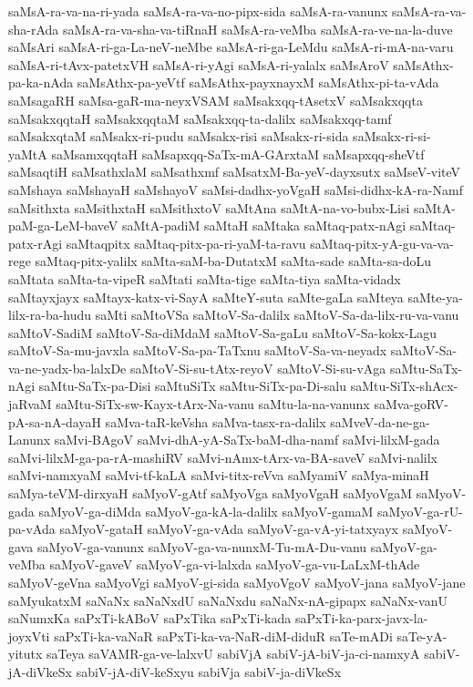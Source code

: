 {saMsA-ra-va-na-ri-yada
saMsA-ra-va-no-pipx-sida
saMsA-ra-vanunx
saMsA-ra-va-sha-rAda
saMsA-ra-va-sha-va-tiRnaH
saMsA-ra-veMba
saMsA-ra-ve-na-la-duve
saMsAri
saMsA-ri-ga-La-neV-neMbe
saMsA-ri-ga-LeMdu
saMsA-ri-mA-na-varu
saMsA-ri-tAvx-patetxVH
saMsA-ri-yAgi
saMsA-ri-yalalx
saMsAroV
saMsAthx-pa-ka-nAda
saMsAthx-pa-yeVtf
saMsAthx-payxnayxM
saMsAthx-pi-ta-vAda
saMsagaRH
saMsa-gaR-ma-neyxVSAM
saMsakxqq-tAsetxV
saMsakxqqta
saMsakxqqtaH
saMsakxqqtaM
saMsakxqq-ta-dalilx
saMsakxqq-tamf
saMsakxqtaM
saMsakx-ri-pudu
saMsakx-risi
saMsakx-ri-sida
saMsakx-ri-si-yaMtA
saMsamxqqtaH
saMsapxqq-SaTx-mA-GArxtaM
saMsapxqq-sheVtf
saMsaqtiH
saMsathxlaM
saMsathxmf
saMsatxM-Ba-yeV-dayxsutx
saMseV-viteV
saMshaya
saMshayaH
saMshayoV
saMsi-dadhx-yoVgaH
saMsi-didhx-kA-ra-Namf
saMsithxta
saMsithxtaH
saMsithxtoV
saMtAna
saMtA-na-vo-bubx-Lisi
saMtA-paM-ga-LeM-baveV
saMtA-padiM
saMtaH
saMtaka
saMtaq-patx-nAgi
saMtaq-patx-rAgi
saMtaqpitx
saMtaq-pitx-pa-ri-yaM-ta-ravu
saMtaq-pitx-yA-gu-va-va-rege
saMtaq-pitx-yalilx
saMta-saM-ba-DutatxM
saMta-sade
saMta-sa-doLu
saMtata
saMta-ta-vipeR
saMtati
saMta-tige
saMta-tiya
saMta-vidadx
saMtayxjayx
saMtayx-katx-vi-SayA
saMteY-suta
saMte-gaLa
saMteya
saMte-ya-lilx-ra-ba-hudu
saMti
saMtoVSa
saMtoV-Sa-dalilx
saMtoV-Sa-da-lilx-ru-va-vanu
saMtoV-SadiM
saMtoV-Sa-diMdaM
saMtoV-Sa-gaLu
saMtoV-Sa-kokx-Lagu
saMtoV-Sa-mu-javxla
saMtoV-Sa-pa-TaTxnu
saMtoV-Sa-va-neyadx
saMtoV-Sa-va-ne-yadx-ba-lalxDe
saMtoV-Si-su-tAtx-reyoV
saMtoV-Si-su-vAga
saMtu-SaTx-nAgi
saMtu-SaTx-pa-Disi
saMtuSiTx
saMtu-SiTx-pa-Di-salu
saMtu-SiTx-shAcx-jaRvaM
saMtu-SiTx-sw-Kayx-tArx-Na-vanu
saMtu-la-na-vanunx
saMva-goRV-pA-sa-nA-dayaH
saMva-taR-keVsha
saMva-tasx-ra-dalilx
saMveV-da-ne-ga-Lanunx
saMvi-BAgoV
saMvi-dhA-yA-SaTx-baM-dha-namf
saMvi-lilxM-gada
saMvi-lilxM-ga-pa-rA-mashiRV
saMvi-nAmx-tArx-va-BA-saveV
saMvi-nalilx
saMvi-namxyaM
saMvi-tf-kaLA
saMvi-titx-reVva
saMyamiV
saMya-minaH
saMya-teVM-dirxyaH
saMyoV-gAtf
saMyoVga
saMyoVgaH
saMyoVgaM
saMyoV-gada
saMyoV-ga-diMda
saMyoV-ga-kA-la-dalilx
saMyoV-gamaM
saMyoV-ga-rU-pa-vAda
saMyoV-gataH
saMyoV-ga-vAda
saMyoV-ga-vA-yi-tatxyayx
saMyoV-gava
saMyoV-ga-vanunx
saMyoV-ga-va-nunxM-Tu-mA-Du-vanu
saMyoV-ga-veMba
saMyoV-gaveV
saMyoV-ga-vi-lalxda
saMyoV-ga-vu-LaLxM-thAde
saMyoV-geVna
saMyoVgi
saMyoV-gi-sida
saMyoVgoV
saMyoV-jana
saMyoV-jane
saMyukatxM
saNaNx
saNaNxdU
saNaNxdu
saNaNx-nA-gipapx
saNaNx-vanU
saNumxKa
saPxTi-kABoV
saPxTika
saPxTi-kada
saPxTi-ka-parx-javx-la-joyxVti
saPxTi-ka-vaNaR
saPxTi-ka-va-NaR-diM-diduR
saTe-mADi
saTe-yA-yitutx
saTeya
saVAMR-ga-ve-lalxvU
sabiVjA
sabiV-jA-biV-ja-ci-namxyA
sabiV-jA-diVkeSx
sabiV-jA-diV-keSxyu
sabiVja
sabiV-ja-diVkeSx
}
